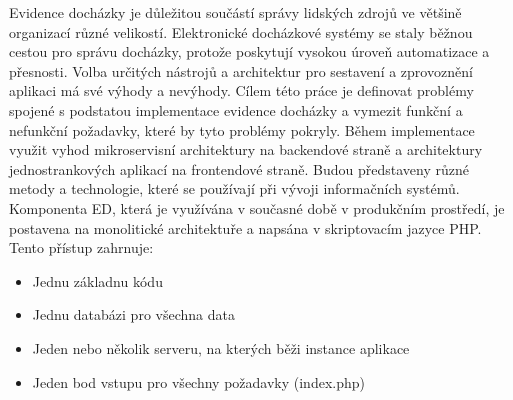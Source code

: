 \documentclass[12pt]{article}
\begin{document}
    Evidence docházky je důležitou součástí správy lidských zdrojů ve většině organizací různé
    velikostí. Elektronické docházkové systémy se staly běžnou cestou pro správu docházky,
    protože poskytují vysokou úroveň automatizace a přesnosti. Volba určitých nástrojů a
    architektur pro sestavení a zprovoznění aplikaci má své výhody a nevýhody. 
    Cílem této práce je definovat problémy spojené s podstatou implementace evidence docházky a 
    vymezit funkční a nefunkční požadavky, které by tyto problémy pokryly. Během implementace 
    využit vyhod mikroservisní architektury na backendové straně a architektury jednostrankových 
    aplikací na frontendové straně. Budou představeny různé metody a technologie, které se používají 
    při vývoji informačních systémů.
Komponenta ED, která je využívána v současné době v produkčním prostředí, je postavena
na monolitické architektuře a napsána v skriptovacím jazyce PHP. Tento přístup zahrnuje:
\begin{itemize}
    \item Jednu základnu kódu
    \item Jednu databázi pro všechna data
    \item Jeden nebo několik serveru, na kterých běži instance aplikace
    \item Jeden bod vstupu pro všechny požadavky (index.php)
\end{itemize}
\end{document}
